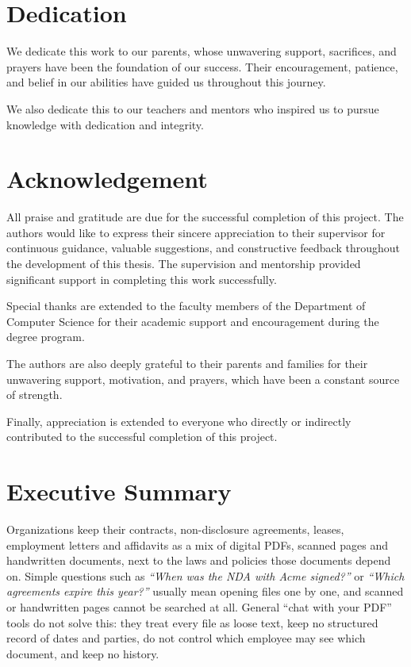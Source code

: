 \chapter*{Dedication}
We dedicate this work to our parents, whose unwavering support, sacrifices, and prayers have
been the foundation of our success. Their encouragement, patience, and belief in our abilities
have guided us throughout this journey.

We also dedicate this to our teachers and mentors who inspired us to pursue knowledge with
dedication and integrity.

\chapter*{Acknowledgement}
All praise and gratitude are due for the successful completion of this project. The authors
would like to express their sincere appreciation to their supervisor for continuous guidance, valuable
suggestions, and constructive feedback throughout the development of this thesis. The supervision
and mentorship provided significant support in completing this work successfully.

Special thanks are extended to the faculty members of the Department of Computer Science
for their academic support and encouragement during the degree program.

The authors are also deeply grateful to their parents and families for their unwavering support,
motivation, and prayers, which have been a constant source of strength.

Finally, appreciation is extended to everyone who directly or indirectly contributed to the
successful completion of this project.

\chapter*{Executive Summary}
Organizations keep their contracts, non-disclosure agreements, leases, employment letters and
affidavits as a mix of digital PDFs, scanned pages and handwritten documents, next to the laws and
policies those documents depend on. Simple questions such as \emph{``When was the NDA with Acme
signed?''} or \emph{``Which agreements expire this year?''} usually mean opening files one by one,
and scanned or handwritten pages cannot be searched at all. General ``chat with your PDF'' tools do not
solve this: they treat every file as loose text, keep no structured record of dates and parties,
do not control which employee may see which document, and keep no history.

